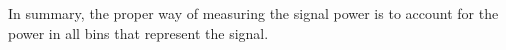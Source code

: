 In summary, the proper way of measuring the signal power is to account for the power in all bins that represent the signal.%
\eExample

%
%
%
%

